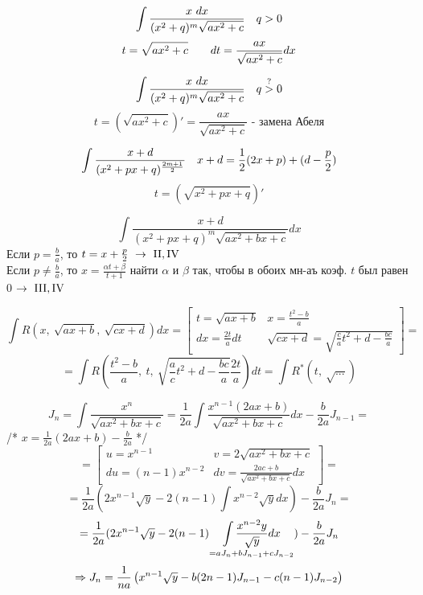 \documentclass[main]{subfiles}
\begin{document}
    \begin{Utv}[\RNumb{3}]
        \[\int \frac{x\ dx}{(x^2 +q)^m \sqrt{ax^2 + c}} \quad q > 0\]
        \[t = \sqrt{ax^2 + c} \qquad dt = \frac{ax}{\sqrt{ax^2 + c}} dx\]
    \end{Utv}

    \begin{Utv}[\RNumb{4}]
        \[\int \frac{x\ dx}{(x^2 +q)^m \sqrt{ax^2 + c}} \quad q \overset{?}{>} 0\]
        \[t = (\sqrt{ax^2 +c})' = \frac{ax}{\sqrt{ax^2 + c}} \text{ - замена Абеля}\]
    \end{Utv}

    \begin{Utv}[\RNumb{5}]
        \[\int \frac{x + d}{(x^2 + px + q)^{\frac{2m + 1}{2}}} \quad x+ d = \frac{1}{2}(2x + p) + (d - \frac{p}{2})\]
        \[t = (\sqrt{x^2 + px + q})'\]
    \end{Utv}

    \begin{Utv}
        \[\int \frac{x + d}{(x^2 + px + q)^m \sqrt{ax^2 + bx + c}}dx\]
        Если $p = \frac{b}{a}$, то $t = x + \frac{p}{2} \ \ra\ \RNumb{2}, \RNumb{4}$\\
        Если $p \neq \frac{b}{a}$, то $x = \frac{\alpha t + \beta}{t + 1}$ найти $\alpha$ и $\beta$ так, чтобы в обоих мн-аъ коэф. $t$ был равен 0$\ \ra\ \RNumb{3},\RNumb{4}$
    \end{Utv}

    \begin{Remark}[*]
        \[\int R(x,\ \sqrt{ax + b},\ \sqrt{cx + d}) dx =
        \left[\begin{matrix}
            t = \sqrt{ax + b} & x = \frac{t^2 - b}{a}\\
            dx = \frac{2t}{a} dt & \sqrt{cx + d} = \sqrt{\frac{c}{a} t^2 + d - \frac{bc}{a}}
        \end{matrix}\right] =\]
        \[=\int R(\frac{t^2 - b}{a},\ t,\ \sqrt{\frac{a}{c}t^2 + d - \frac{bc}{a}} \frac{2t}{a})dt = \int R^*(t,\ \sqrt{...})\]
    \end{Remark}

    \begin{Example}
        \[J_n = \int \frac{x^n}{\sqrt{ax^2 + bx + c}} = \frac{1}{2a} \int \frac{x^{n-1}(2ax + b)}{\sqrt{ax^2 + bx + c}}dx - \frac{b}{2a} J_{n-1} =\]
        /* $x = \frac{1}{2a}(2ax + b) - \frac{b}{2a}$ */
        \[= \left[\begin{matrix}
            u = x^{n-1} & v = 2 \sqrt{ax^2 + bx + c}\\
            du = (n-1) x^{n-2} & dv = \frac{2ac + b}{\sqrt{ax^2 + bx + c}}dx
        \end{matrix}\right] =\]
        \[= \frac{1}{2a} (2 x^{n-1} \sqrt{y} - 2(n-1) \int x^{n-2} \sqrt{y} dx) - \frac{b}{2a} J_n =\]
        \[= \frac{1}{2a} (2x^{n-1}\sqrt{y} - 2(n-1) \underset{= a J_n + b J_{n-1} + c J_{n-2}}{\int \frac{x^{n-2} y}{\sqrt{y}} dx}) - \frac{b}{2a} J_n\]
        \[\Rightarrow J_n = \frac{1}{na} \left(x^{n-1} \sqrt{y} - b (2n - 1) J_{n-1} - c (n-1) J_{n-2}\right)\]
    \end{Example}
\end{document}
